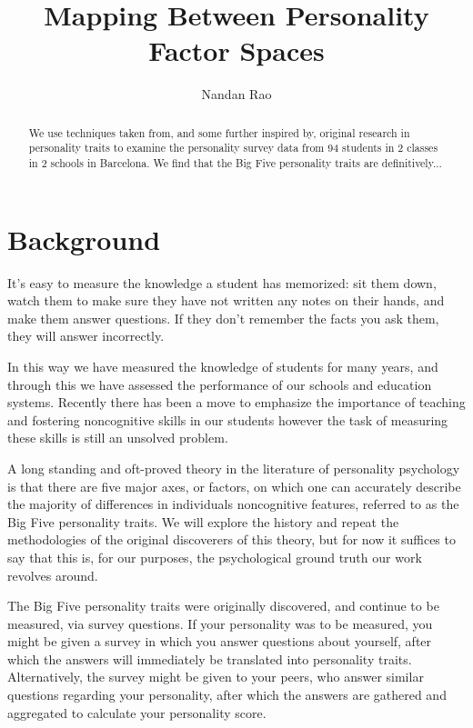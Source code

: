 \documentclass[a4paper,12pt]{article}
\begin{document}
\title{Mapping Between Personality Factor Spaces}

\author{Nandan Rao}

\maketitle

\begin{abstract}
  We use techniques taken from, and some further inspired by, original research in personality traits to examine the personality survey data from 94 students in 2 classes in 2 schools in Barcelona. We find that the Big Five personality traits are definitively...
\end{abstract}

\section{Background}
It's easy to measure the knowledge a student has memorized: sit them down, watch them to make sure they have not written any notes on their hands, and make them answer questions. If they don't remember the facts you ask them, they will answer incorrectly.

In this way we have measured the knowledge of students for many years, and through this we have assessed the performance of our schools and education systems. Recently there has been a move to emphasize the importance of teaching and fostering noncognitive skills in our students however the task of measuring these skills is still an unsolved problem.

A long standing and oft-proved theory in the literature of personality psychology is that there are five major axes, or factors, on which one can accurately describe the majority of differences in individuals noncognitive features, referred to as the Big Five personality traits. We will explore the history and repeat the methodologies of the original discoverers of this theory, but for now it suffices to say that this is, for our purposes, the psychological ground truth our work revolves around.

The Big Five personality traits were originally discovered, and continue to be measured, via survey questions. If your personality was to be measured, you might be given a survey in which you answer questions about yourself, after which the answers will immediately be translated into personality traits. Alternatively, the survey might be given to your peers, who answer similar questions regarding your personality, after which the answers are gathered and aggregated to calculate your personality score.
\end{document}

